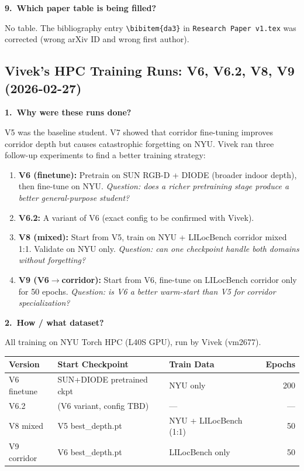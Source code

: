 \documentclass[11pt,a4paper]{article}
\begin{document}
\textbf{9.\ Which paper table is being filled?}

No table.  The bibliography entry \texttt{\textbackslash bibitem\{da3\}}
in \texttt{Research Paper v1.tex} was corrected (wrong arXiv ID
and wrong first author).


\subsection*{Vivek's HPC Training Runs: V6, V6.2, V8, V9 (2026-02-27)}

\textbf{1.\ Why were these runs done?}

V5 was the baseline student.  V7 showed that corridor fine-tuning
improves corridor depth but causes catastrophic forgetting on NYU.
Vivek ran three follow-up experiments to find a better training
strategy:

\begin{enumerate}
  \item \textbf{V6 (finetune):} Pretrain on SUN RGB-D + DIODE (broader
    indoor depth), then fine-tune on NYU.
    \emph{Question: does a richer pretraining stage produce a better
    general-purpose student?}
  \item \textbf{V6.2:} A variant of V6 (exact config to be confirmed
    with Vivek).
  \item \textbf{V8 (mixed):} Start from V5, train on NYU + LILocBench
    corridor mixed 1:1.  Validate on NYU only.
    \emph{Question: can one checkpoint handle both domains without
    forgetting?}
  \item \textbf{V9 (V6$\to$corridor):} Start from V6, fine-tune on
    LILocBench corridor only for 50 epochs.
    \emph{Question: is V6 a better warm-start than V5 for corridor
    specialization?}
\end{enumerate}

\textbf{2.\ How / what dataset?}

All training on NYU Torch HPC (L40S GPU), run by Vivek (vm2677).

\begin{center}
\footnotesize
\begin{tabular}{lllr}
\toprule
\textbf{Version} & \textbf{Start Checkpoint} & \textbf{Train Data}
  & \textbf{Epochs} \\
\midrule
V6 finetune & SUN+DIODE pretrained ckpt & NYU only & 200 \\
V6.2        & (V6 variant, config TBD)  & --- & --- \\
V8 mixed    & V5 best\_depth.pt         & NYU + LILocBench (1:1) & 50 \\
V9 corridor & V6 best\_depth.pt         & LILocBench only & 50 \\
\bottomrule
\end{tabular}
\end{center}
\end{document}
